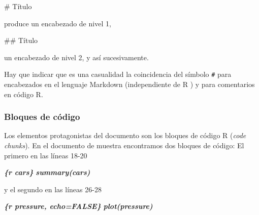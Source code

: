 \documentclass[
  title=normal,
  notoc,
  bib=normal]{mnye}
\newenvironment{Shaded}{\begin{snugshade}}{\end{snugshade}}
\newcommand{\FunctionTok}[1]{\textcolor[rgb]{0.00,0.00,0.00}{#1}}
\newcommand{\InformationTok}[1]{\textcolor[rgb]{0.56,0.35,0.01}{\textbf{\textit{#1}}}}
\begin{document}
\begin{Shaded}
\begin{Highlighting}[]
\FunctionTok{\# Título}
\end{Highlighting}
\end{Shaded}

produce un encabezado de nivel 1,

\begin{Shaded}
\begin{Highlighting}[]
\FunctionTok{\#\# Título}
\end{Highlighting}
\end{Shaded}

un encabezado de nivel 2, y así sucesivamente.

\begin{infobox}
Hay que indicar que es una casualidad la coincidencia del símbolo \texttt{\#} para encabezados en el lenguaje Markdown (independiente de \textsf{R} ) y para comentarios en código \textsf{R}.

\end{infobox}

\hypertarget{bloques-de-cuxf3digo}{%
\subsubsection{Bloques de código}\label{bloques-de-cuxf3digo}}

Los elementos protagonistas del documento son los bloques de código \textsf{R} (\emph{code chunks}). En el documento de muestra encontramos dos bloques de código: El primero en las líneas 18-20

\begin{Shaded}
\begin{Highlighting}[]
\InformationTok{\textasciigrave{}\textasciigrave{}\textasciigrave{}\{r cars\}}
\InformationTok{summary(cars)}
\InformationTok{\textasciigrave{}\textasciigrave{}\textasciigrave{}}
\end{Highlighting}
\end{Shaded}

y el segundo en las líneas 26-28

\begin{Shaded}
\begin{Highlighting}[]
\InformationTok{\textasciigrave{}\textasciigrave{}\textasciigrave{}\{r pressure, echo=FALSE\}}
\InformationTok{plot(pressure)}
\InformationTok{\textasciigrave{}\textasciigrave{}\textasciigrave{}}
\end{Highlighting}
\end{Shaded}
\end{document}
